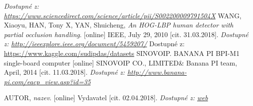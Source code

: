 \begin{thebibliography}{99}
 		\textit{Dostupné z: \url{https://www.sciencedirect.com/science/article/pii/S002200009791504X}}
 	 WANG, Xiaoyu, HAN, Tony X, YAN, Shuicheng, \textit{An HOG-LBP human detector with partial occlusion handling}. [online] IEEE, July 29, 2010 [cit. 31.03.2018]. 
 	\textit{Dostupné z: \url{http://ieeexplore.ieee.org/document/5459207/}}
 	 Dostupné z: \url{https://www.kaggle.com/sudipdas/datasets}
	 SINOVOIP. BANANA PI BPI-M1 single-board computer [online] SINOVOIP CO., LIMITED\& Banana PI team, April, 2014  [cit. 11.03.2018]. 
		\textit{Dostupné z: \url{http://www.banana-pi.com/eacp_view.asp?id=35}}
 
 \bibitem{} AUTOR, \textit{nazev}. [online] Vydavatel [cit. 02.04.2018]. 
 	\textit{Dostupné z: \url{web}}
\end{thebibliography}
